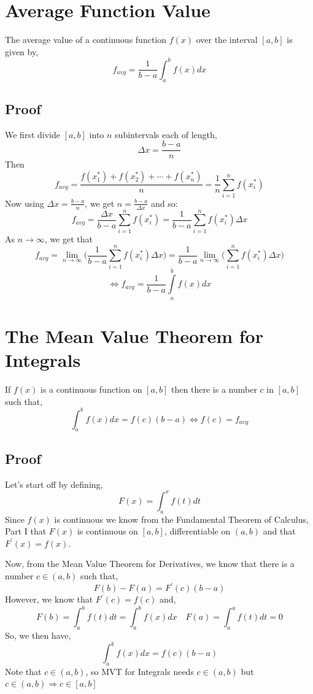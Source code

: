\documentclass[10pt]{article}
\begin{document}
\section{Average Function Value}
The average value of a continuous function $f(x)$ over the interval $[a, b]$ is given by,
$$
f_{a v g}=\frac{1}{b-a} \int_{a}^{b} f(x) d x
$$

\subsection{Proof}
We first divide $[a, b]$ into $n$ subintervals each of length,
$$
\Delta x=\frac{b-a}{n}
$$
Then
$$
f_{avg} = \frac{f\left(x_{1}^{*}\right)+f\left(x_{2}^{*}\right)+\cdots+f\left(x_{n}^{*}\right)}{n} = \frac{1}{n}  \sum \limits _{i=1}^nf(x_i^*)
$$
Now using $\Delta x=\frac{b-a}{n}$, we get $n=\frac{b-a}{\Delta x}$ and so:
$$
f_{avg} =  \frac{\Delta x}{b-a}  \sum \limits _{i=1}^nf(x_i^*) = \frac{1}{b-a}  \sum \limits _{i=1}^nf(x_i^*)\Delta x
$$
As $n \to \infty$, we get that
$$
f_{avg} = \lim _{n \to \infty} \bigg(\frac{1}{b-a}  \sum \limits _{i=1}^nf(x_i^*)\Delta x\bigg ) 
 =\frac{1}{b-a}  \lim _{n \to \infty} \bigg( \sum \limits _{i=1}^nf(x_i^*)\Delta x\bigg ) 
$$
$$
\iff f_{avg}=\frac{1}{b-a}\int \limits _a^bf(x)dx
$$

\section{The Mean Value Theorem for Integrals}
If $f(x)$ is a continuous function on $[a, b]$ then there is a number $c$ in $[a, b]$ such that,
$$
\int_{a}^{b} f(x) d x=f(c)(b-a) \iff f(c)=f_{avg}
$$

\subsection{Proof}
Let's start off by defining,
$$
F(x)=\int_{a}^{x} f(t) d t
$$
Since $f(x)$ is continuous we know from the Fundamental Theorem of Calculus, Part I that $F(x)$ is continuous on $[a, b]$, differentiable on $(a, b)$ and that $F^{\prime}(x)=f(x)$.

Now, from the Mean Value Theorem for Derivatives, we know that there is a number $c\in (a,b)$ such that,
$$
F(b)-F(a)=F^{\prime}(c)(b-a)
$$
However, we know that $F^{\prime}(c)=f(c)$ and,
$$
F(b)=\int_{a}^{b} f(t) d t=\int_{a}^{b} f(x) d x \quad F(a)=\int_{a}^{a} f(t) d t=0
$$
So, we then have,
$$
\int_{a}^{b} f(x) d x=f(c)(b-a)
$$
Note that $c\in (a,b)$, so MVT for Integrals needs $c\in (a,b)$ but $c\in (a,b) \Rightarrow c\in [a,b]$
\end{document}
